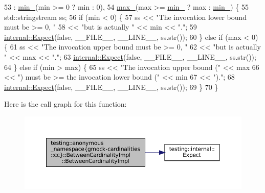 \begin{DoxyCode}
53       : \hyperlink{classtesting_1_1anonymous__namespace_02gmock-cardinalities_8cc_03_1_1BetweenCardinalityImpl_aaa6c70686dc7e205bd949c11b21648e8}{min\_}(min >= 0 ? min : 0),
54         \hyperlink{classtesting_1_1anonymous__namespace_02gmock-cardinalities_8cc_03_1_1BetweenCardinalityImpl_acf6f35b47bf9f52b714ccceb22255aeb}{max\_}(max >= \hyperlink{classtesting_1_1anonymous__namespace_02gmock-cardinalities_8cc_03_1_1BetweenCardinalityImpl_aaa6c70686dc7e205bd949c11b21648e8}{min\_} ? max : \hyperlink{classtesting_1_1anonymous__namespace_02gmock-cardinalities_8cc_03_1_1BetweenCardinalityImpl_aaa6c70686dc7e205bd949c11b21648e8}{min\_}) \{
55     std::stringstream ss;
56     \textcolor{keywordflow}{if} (min < 0) \{
57       ss << \textcolor{stringliteral}{"The invocation lower bound must be >= 0, "}
58          << \textcolor{stringliteral}{"but is actually "} << min << \textcolor{stringliteral}{"."};
59       \hyperlink{namespacetesting_1_1internal_ab3000fc56be000e4fa6ed7cdcfee3106}{internal::Expect}(\textcolor{keyword}{false}, \_\_FILE\_\_, \_\_LINE\_\_, ss.str());
60     \} \textcolor{keywordflow}{else} \textcolor{keywordflow}{if} (max < 0) \{
61       ss << \textcolor{stringliteral}{"The invocation upper bound must be >= 0, "}
62          << \textcolor{stringliteral}{"but is actually "} << max << \textcolor{stringliteral}{"."};
63       \hyperlink{namespacetesting_1_1internal_ab3000fc56be000e4fa6ed7cdcfee3106}{internal::Expect}(\textcolor{keyword}{false}, \_\_FILE\_\_, \_\_LINE\_\_, ss.str());
64     \} \textcolor{keywordflow}{else} \textcolor{keywordflow}{if} (min > max) \{
65       ss << \textcolor{stringliteral}{"The invocation upper bound ("} << max
66          << \textcolor{stringliteral}{") must be >= the invocation lower bound ("} << min
67          << \textcolor{stringliteral}{")."};
68       \hyperlink{namespacetesting_1_1internal_ab3000fc56be000e4fa6ed7cdcfee3106}{internal::Expect}(\textcolor{keyword}{false}, \_\_FILE\_\_, \_\_LINE\_\_, ss.str());
69     \}
70   \}
\end{DoxyCode}
Here is the call graph for this function\+:
\nopagebreak
\begin{figure}[H]
\begin{center}
\leavevmode
\includegraphics[width=350pt]{classtesting_1_1anonymous__namespace_02gmock-cardinalities_8cc_03_1_1BetweenCardinalityImpl_a4dfb0c608c068f816775ecc513a2f7b9_cgraph}
\end{center}
\end{figure}


